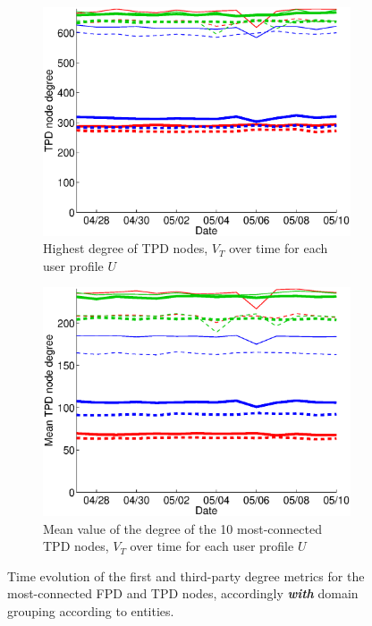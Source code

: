 \documentclass{sig-alternate}
\begin{document}
\begin{figure}
\begin{subfigure}{.38\textwidth}
  \end{subfigure}
  \begin{subfigure}{.38\textwidth}
    \includegraphics[width=\textwidth]{figures/plots/third-mean-top1-entities.eps}
    \caption{Highest degree of TPD nodes, $V_T$ over time for each user profile $U$}
    \label{fig:third_mean_top1_without_entities}
  \end{subfigure}
  \begin{subfigure}{.38\textwidth}
    \includegraphics[width=\textwidth]{figures/plots/third-mean-top10-entities.eps}
    \caption{Mean value of the degree of the 10 most-connected TPD nodes, $V_T$ over time for each user profile $U$}
    \label{fig:third_mean_top10_without_entities}
  \end{subfigure}

  \caption{Time evolution of the first and third-party degree metrics for the most-connected FPD and TPD nodes, accordingly \textbf{\textit{with}} domain grouping according to entities.}
  \label{fig:highest_degree_nodes_with_entities}
  \end{figure}
\end{document}
